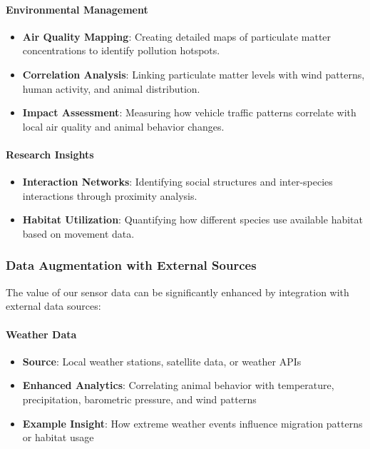 \paragraph{Environmental Management}
\begin{itemize}
  \item \textbf{Air Quality Mapping}: Creating detailed maps of particulate matter concentrations to identify pollution hotspots.
  \item \textbf{Correlation Analysis}: Linking particulate matter levels with wind patterns, human activity, and animal distribution.
  \item \textbf{Impact Assessment}: Measuring how vehicle traffic patterns correlate with local air quality and animal behavior changes.
\end{itemize}

\paragraph{Research Insights}
\begin{itemize}
  \item \textbf{Interaction Networks}: Identifying social structures and inter-species interactions through proximity analysis.
  \item \textbf{Habitat Utilization}: Quantifying how different species use available habitat based on movement data.
\end{itemize}

\subsubsection{Data Augmentation with External Sources}

The value of our sensor data can be significantly enhanced by integration with external data sources:

\paragraph{Weather Data}
\begin{itemize}
  \item \textbf{Source}: Local weather stations, satellite data, or weather APIs
  \item \textbf{Enhanced Analytics}: Correlating animal behavior with temperature, precipitation, barometric pressure, and wind patterns
  \item \textbf{Example Insight}: How extreme weather events influence migration patterns or habitat usage
\end{itemize}

